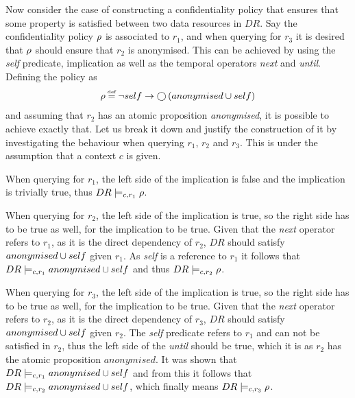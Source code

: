 \begin{example}
Now consider the case of constructing a confidentiality policy that ensures that some property is satisfied between two data resources in $DR$. Say the confidentiality policy $\rho$ is associated to $r_1$, and when querying for $r_3$ it is desired that $\rho$ should ensure that $r_2$ is anonymised. This can be achieved by using the \emph{self} predicate, implication as well as the temporal operators \emph{next} and \emph{until}. Defining the policy as 
\begin{align*}
    \conf \eqdef \lnot self \imply \X \left( anonymised \U self \right)
\end{align*}
and assuming that $r_2$ has an atomic proposition \emph{anonymised}, it is possible to achieve exactly that. Let us break it down and justify the construction of it by investigating the behaviour when querying $r_1$, $r_2$ and $r_3$. This is under the assumption that a context $c$ is given.

When querying for $r_1$, the left side of the implication is false and the implication is trivially true, thus $DR \models_{c,r_1} \rho$. 

When querying for $r_2$, the left side of the implication is true, so the right side has to be true as well, for the implication to be true. Given that the \emph{next} operator refers to $r_1$, as it is the direct dependency of $r_2$, $DR$ should satisfy $anonymised \cup self$ given $r_1$. As \emph{self} is a reference to $r_1$ it follows that $DR \models_{c,r_1} anonymised \cup self$ and thus $DR \models_{c,r_2} \rho$.

When querying for $r_3$, the left side of the implication is true, so the right side has to be true as well, for the implication to be true. Given that the \emph{next} operator refers to $r_2$, as it is the direct dependency of $r_3$, $DR$ should satisfy $anonymised \cup self$ given $r_2$. The \emph{self} predicate refers to $r_1$ and can not be satisfied in $r_2$, thus the left side of the \emph{until} should be true, which it is as $r_2$ has the atomic proposition $anonymised$. It was shown that $DR \models_{c,r_1} anonymised \cup self$ and from this it follows that $DR \models_{c,r_2} anonymised \cup self$, which finally means $DR \models_{c,r_3} \rho$.
\end{example}

